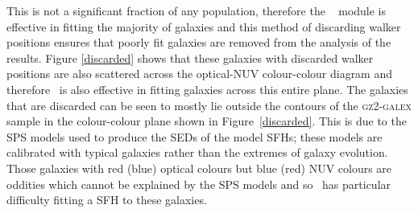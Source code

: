 This is not a significant fraction of any population, therefore the \starpy~ module is effective in fitting the majority of galaxies and this method of discarding walker positions ensures that poorly fit galaxies are removed from the analysis of the results. Figure \ref{discarded} shows that these galaxies with discarded walker positions are also scattered across the optical-NUV colour-colour diagram and therefore \starpy ~is also effective in fitting galaxies across this entire plane. The galaxies that are discarded can be seen to mostly lie outside the contours of the \textsc{gz2-galex} sample in the colour-colour plane shown in Figure~\ref{discarded}. This is due to the SPS models used to produce the SEDs of the model SFHs; these models are calibrated with typical galaxies rather than the extremes of galaxy evolution. Those galaxies with red (blue) optical colours but blue (red) NUV colours are oddities which cannot be explained by the SPS models and so \starpy~has particular difficulty fitting a SFH to these galaxies.

\begin{table}
\end{table}

